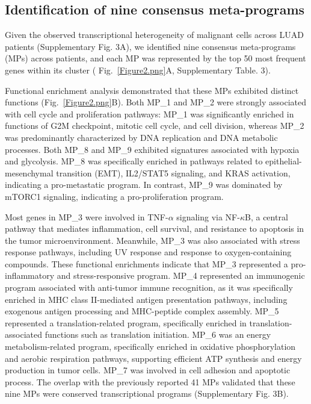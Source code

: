 \documentclass[pdflatex,sn-mathphys-num]{sn-jnl}%
\theoremstyle{thmstyleone}%
\theoremstyle{thmstyletwo}%
\theoremstyle{thmstylethree}%
\begin{document}
\subsection{Identification of nine consensus meta-programs}\label{subsec2}

Given the observed transcriptional heterogeneity of malignant cells across LUAD patients (Supplementary Fig. 3A), we identified nine consensus meta-programs (MPs) across patients, and each MP was represented by the top 50 most frequent genes within its cluster ( Fig.~\ref{Figure2.png}A, Supplementary Table. 3).

Functional enrichment analysis demonstrated that these MPs exhibited distinct functions (Fig.~\ref{Figure2.png}B). Both MP\_1 and MP\_2 were strongly associated with cell cycle and proliferation pathways: MP\_1 was significantly enriched in functions of G2M checkpoint, mitotic cell cycle, and cell division, whereas MP\_2 was predominantly characterized by DNA replication and DNA metabolic processes. Both MP\_8 and MP\_9 exhibited signatures associated with hypoxia and glycolysis. MP\_8 was specifically enriched in pathways related to epithelial-mesenchymal transition (EMT), IL2/STAT5 signaling, and KRAS activation, indicating a pro-metastatic program. In contrast, MP\_9 was dominated by mTORC1 signaling, indicating a pro-proliferation program.

Most genes in MP\_3 were involved in TNF-$\alpha$ signaling via NF-$\kappa$B, a central pathway that mediates inflammation, cell survival, and resistance to apoptosis in the tumor microenvironment. Meanwhile, MP\_3 was also associated with stress response pathways, including UV response and response to oxygen-containing compounds. These functional enrichments indicate that MP\_3 represented a pro-inflammatory and stress-responsive program. MP\_4 represented an immunogenic program associated with anti-tumor immune recognition, as it was specifically enriched in MHC class II-mediated antigen presentation pathways, including exogenous antigen processing and MHC-peptide complex assembly.
MP\_5 represented a translation-related program, specifically enriched in translation-associated functions such as translation initiation. MP\_6 was an energy metabolism-related program, specifically enriched in oxidative phosphorylation and aerobic respiration pathways, supporting efficient ATP synthesis and energy production in tumor cells. MP\_7 was involved in cell adhesion and apoptotic process. The overlap with the previously reported 41 MPs validated that these nine MPs were conserved transcriptional programs (Supplementary Fig. 3B).
\end{document}
